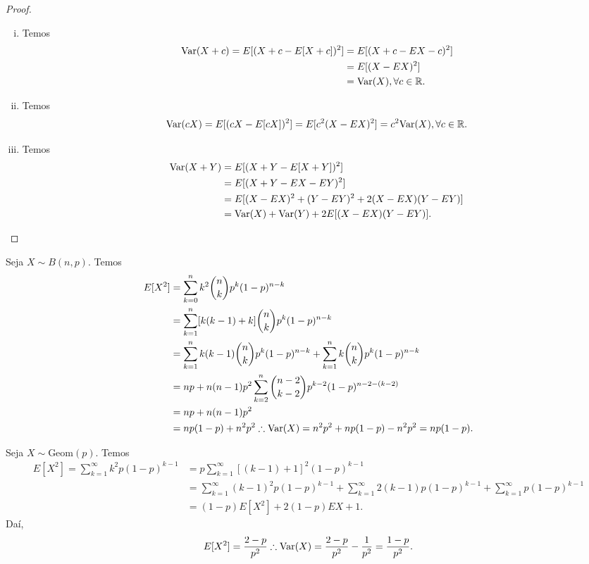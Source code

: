 \documentclass[../Notas.tex]{subfiles}
\begin{document}
\begin{proof}
\begin{itemize}
\begin{enumerate}[(i)]
        \item Temos
        \begin{align*}
            \text{Var}(X+c) = E[(X+c - E[X+c])^2] &= E[(X + c - EX - c)^2] \\
            &= E[(X-EX)^2] \\
            &= \text{Var}(X), \forall c\in\mathbb{R}.
        \end{align*}
        
        \item Temos
        \begin{align*}
            \text{Var}(cX) = E[(cX - E[cX])^2] = E[c^2(X-EX)^2] = c^2\text{Var}(X), \forall c\in\mathbb{R}.
        \end{align*}
        
        \item Temos
        \begin{align*}
            \text{Var}(X+Y) &= E[(X+Y - E[X+Y])^2] \\
            &= E[(X+Y-EX-EY)^2] \\
            &= E[(X-EX)^2 + (Y-EY)^2 + 2(X-EX)(Y-EY)] \\
            &= \text{Var}(X) + \text{Var}(Y) +2E[(X-EX)(Y-EY)].
        \end{align*}
    \end{enumerate}
\end{itemize}
\end{proof}

\begin{example}
Seja $X\sim B(n,p)$. Temos
\begin{align*}
    E[X^2] &= \sum_{k=0}^{n}k^2\binom{n}{k}p^k(1-p)^{n-k} \\
    &= \sum_{k=1}^{n} [k(k-1) + k]\binom{n}{k}p^k(1-p)^{n-k} \\
    &= \sum_{k=1}^{n} k(k-1)\binom{n}{k}p^k(1-p)^{n-k} + \sum_{k=1}^{n} k\binom{n}{k}p^k(1-p)^{n-k} \\
    &= np + n(n-1)p^2\sum_{k=2}^{n}\binom{n-2}{k-2}p^{k-2}(1-p)^{n-2 - (k-2)} \\
    &= np + n(n-1)p^2 \\
    &= np(1-p) + n^2p^2 \therefore \text{Var}(X) = n^2p^2 + np(1-p) - n^2p^2 = np(1-p).
\end{align*}
\end{example}

\begin{example}
Seja $X\sim\text{Geom}(p)$. Temos
\begin{align*}
    E[X^2] = \sum_{k=1}^{\infty} k^2 p(1-p)^{k-1} &= p\sum_{k=1}^{\infty} [(k-1)+1]^2 (1-p)^{k-1} \\
    &= \sum_{k=1}^{\infty} (k-1)^2 p(1-p)^{k-1} + \sum_{k=1}^{\infty} 2(k-1)p(1-p)^{k-1} + \sum_{k=1}^{\infty} p(1-p)^{k-1} \\
    &= (1-p)E[X^2] + 2(1-p)EX + 1.
\end{align*}
Daí,
\begin{align*}
    E[X^2] = \frac{2-p}{p^2} \therefore \text{Var}(X) = \frac{2-p}{p^2} - \frac{1}{p^2} = \frac{1-p}{p^2}.
\end{align*}
\end{example}
\end{document}
